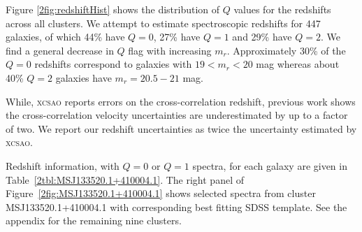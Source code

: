 Figure \ref{2fig:redshiftHist} shows the distribution of $Q$ values for the redshifts across all clusters. We attempt to estimate spectroscopic redshifts for 447 galaxies, of which 44\% have $Q=0$, 27\% have $Q=1$ and 29\% have $Q=2$.  We find a general decrease in $Q$ flag with increasing $m_r$. Approximately 30\% of the $Q=0$ redshifts correspond to galaxies with $19 < m_r <20$ mag whereas about 40\% $Q=2$ galaxies have $m_r = 20.5-21$ mag.

While, \textsc{xcsao} reports errors on the cross-correlation redshift, previous work  shows the cross-correlation velocity uncertainties are underestimated by up to a factor of two. We report our redshift uncertainties as twice the uncertainty estimated by \textsc{xcsao}.

Redshift information, with $Q=0$ or $Q=1$ spectra, for each galaxy are given in Table~\ref{2tbl:MSJ133520.1+410004.1}. The right panel of Figure~\ref{2fig:MSJ133520.1+410004.1} shows selected spectra from cluster MSJ133520.1+410004.1 with corresponding best fitting SDSS template. See the appendix for the remaining nine clusters.

